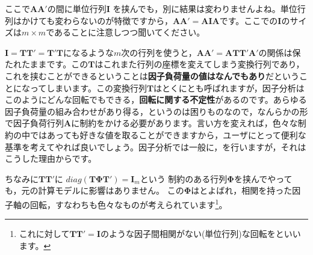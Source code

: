 \documentclass{ltjsbook}
\begin{document}
ここで$\bm{AA'}$の間に単位行列$\bm{I}$ を挟んでも，別に結果は変わりませんよね。単位行列はかけても変わらないのが特徴ですから，$\bm{AA'}=\bm{AIA}$です。ここでの$\bm{I}$のサイズは$m \times m$であることに注意しつつ聞いてください。

$\bm{I} = \bm{TT'}=\bm{T'T}$になるような$m$次の行列を使うと，$\bm{AA'} = \bm{ATT'A'}$の関係は保たれたままです。この$\bm{T}$はこれまた行列の座標を変えてしまう変換行列であり，これを挟むことができるということは\textbf{因子負荷量の値はなんでもあり}だということになってしまいます。この変換行列$\bm{T}$はとくにとも呼ばれますが，因子分析はこのようにどんな回転でもできる，\textbf{回転に関する不定性}があるのです。あらゆる因子負荷量の組み合わせがあり得る，というのは困りものなので，なんらかの形で因子負荷行列$\bm{A}$に制約をかける必要があります。言い方を変えれば，色々な制約の中ではあっても好きな値を取ることができますから，ユーザにとって便利な基準を考えてやれば良いでしょう。因子分析では一般に，を行いますが，それはこうした理由からです。

ちなみに$\bm{TT'}$に
$diag(\bm{T\Phi T'})=\bm{I}_m$という
制約のある行列$\bm{\Phi}$を挟んでやっても，元の計算モデルに影響はありません。
この$\bm{\Phi}$はとよばれ，相関を持った因子軸の回転，すなわちも色々なものが考えられています\footnote{これに対して$\bm{TT'}=\bm{I}$のような因子間相関がない(単位行列)な回転をといいます。}。
\end{document}
